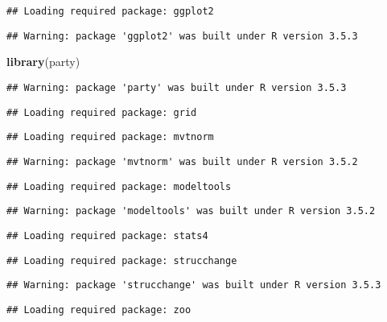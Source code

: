 \documentclass[]{article}
\newenvironment{Shaded}{\begin{snugshade}}{\end{snugshade}}
\newcommand{\KeywordTok}[1]{\textcolor[rgb]{0.13,0.29,0.53}{\textbf{#1}}}
\newcommand{\NormalTok}[1]{#1}
\begin{document}
\begin{verbatim}
## Loading required package: ggplot2
\end{verbatim}

\begin{verbatim}
## Warning: package 'ggplot2' was built under R version 3.5.3
\end{verbatim}

\begin{Shaded}
\begin{Highlighting}[]
\KeywordTok{library}\NormalTok{(party)}
\end{Highlighting}
\end{Shaded}

\begin{verbatim}
## Warning: package 'party' was built under R version 3.5.3
\end{verbatim}

\begin{verbatim}
## Loading required package: grid
\end{verbatim}

\begin{verbatim}
## Loading required package: mvtnorm
\end{verbatim}

\begin{verbatim}
## Warning: package 'mvtnorm' was built under R version 3.5.2
\end{verbatim}

\begin{verbatim}
## Loading required package: modeltools
\end{verbatim}

\begin{verbatim}
## Warning: package 'modeltools' was built under R version 3.5.2
\end{verbatim}

\begin{verbatim}
## Loading required package: stats4
\end{verbatim}

\begin{verbatim}
## Loading required package: strucchange
\end{verbatim}

\begin{verbatim}
## Warning: package 'strucchange' was built under R version 3.5.3
\end{verbatim}

\begin{verbatim}
## Loading required package: zoo
\end{verbatim}
\end{document}
